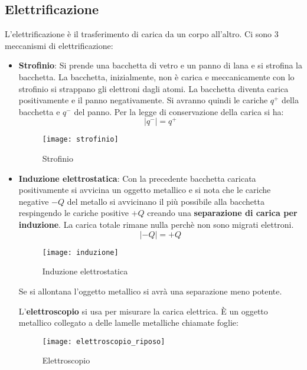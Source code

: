 \documentclass[a4paper]{article}
\begin{document}
\subsection{Elettrificazione}
L'elettrificazione è il trasferimento di carica da un corpo all'altro. Ci sono 3 
meccanismi di elettrificazione:
\begin{itemize}
  \item \textbf{Strofinio}:
    Si prende una bacchetta di vetro e un panno di lana e si strofina la bacchetta.
    La bacchetta, inizialmente, non è carica e meccanicamente con lo strofinio si strappano
    gli elettroni dagli atomi. La bacchetta diventa carica positivamente e il panno
    negativamente. Si avranno quindi le cariche \( q^+ \) della bacchetta e \( q^- \)
    del panno. Per la legge di conservazione della carica si ha:
    \[
      |q^-| = q^+
    \] 
    \begin{figure}[H]
      \centering
      \texttt{[image: strofinio]}
      \caption{Strofinio}
    \end{figure}
  \item \textbf{Induzione elettrostatica}:
    Con la precedente bacchetta caricata positivamente si avvicina un oggetto metallico e
    si nota che le cariche negative \( -Q \)  del metallo si avvicinano il più possibile 
    alla bacchetta respingendo le cariche positive \( +Q \)  creando una 
    \textbf{separazione di carica per induzione}. La carica totale rimane nulla perchè 
    non sono migrati elettroni.
    \[
      |-Q| = +Q
    \] 
    \begin{figure}[H]
      \centering
      \texttt{[image: induzione]}
      \caption{Induzione elettrostatica}
    \end{figure}
    \noindent
    Se si allontana l'oggetto metallico si avrà una separazione meno potente.

    \vspace{1em}
    \noindent
    L'\textbf{elettroscopio} si usa per misurare la carica elettrica. È un oggetto metallico
    collegato a delle lamelle metalliche chiamate foglie:
    \begin{figure}[H]
      \centering
      \texttt{[image: elettroscopio\_riposo]}
      \caption{Elettroscopio}
    \end{figure}


\end{itemize}
\end{document}
